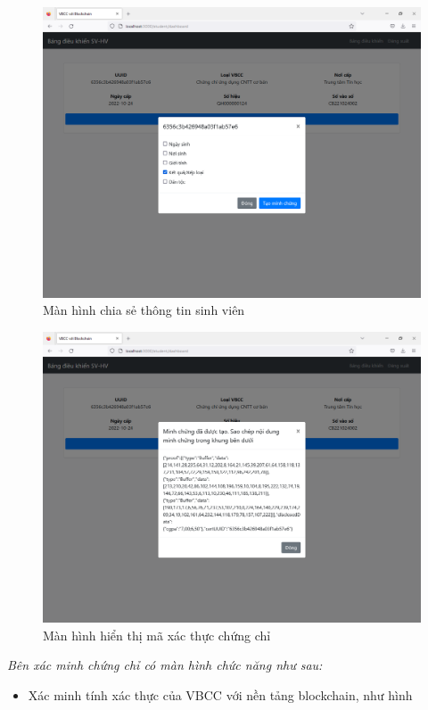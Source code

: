 \begin{figure}[htbp]
\centering
\includegraphics[width=.9\linewidth]{img/sv_chiase.PNG}
\caption{Màn hình chia sẻ thông tin sinh viên}
\label{fig:sv_chiase}
\end{figure}

\begin{figure}[htbp]
\centering
\includegraphics[width=.9\linewidth]{img/sv_minhchung.PNG}
\caption{Màn hình hiển thị mã xác thực chứng chỉ}
\label{fig:sv_minhchung}
\end{figure}



\emph{Bên xác minh chứng chỉ có màn hình chức năng như sau:}

\begin{itemize}
\item Xác minh tính xác thực của VBCC với nền tảng blockchain, như hình 
\end{itemize}

